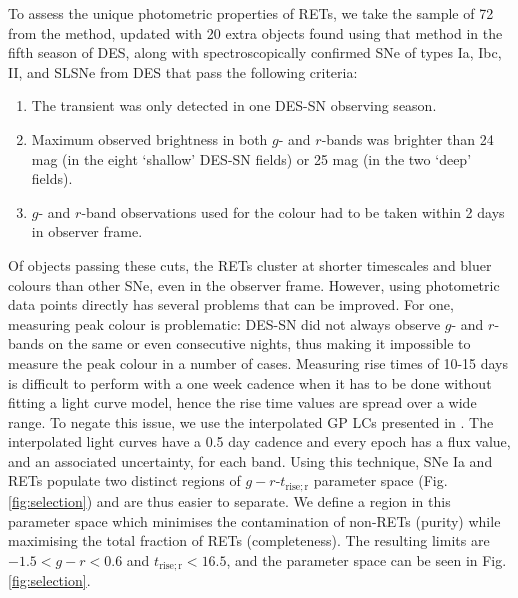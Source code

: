 \documentclass[fleqn,usenatbib,]{mnras}
\begin{document}
To assess the unique photometric properties of RETs, we take the sample of 72 from the  method, updated with 20 extra objects found using that method in the fifth season of DES, along with spectroscopically confirmed SNe of types Ia, Ibc, II, and SLSNe from DES that pass the following criteria:
\begin{enumerate}
\item The transient was only detected in one DES-SN observing season.
\item Maximum observed brightness in both $g$- and $r$-bands was brighter than 24 mag (in the eight `shallow' DES-SN fields) or 25 mag (in the two `deep' fields).
\item $g$- and $r$-band observations used for the colour had to be taken within 2 days in observer frame.
\end{enumerate}

Of objects passing these cuts, the RETs cluster at shorter timescales and bluer colours than other SNe, even in the observer frame. However, using photometric data points directly has several problems that can be improved. For one, measuring peak colour is problematic: DES-SN did not always observe $g$- and $r$-bands on the same or even consecutive nights, thus making it impossible to measure the peak colour in a number of cases. Measuring rise times of 10-15 days is difficult to perform with a one week cadence when it has to be done without fitting a light curve model, hence the rise time values are spread over a wide range. To negate this issue, we use the interpolated GP LCs presented in \citet{Pursiainen2019}. The interpolated light curves have a 0.5 day cadence and every epoch has a flux value, and an associated uncertainty, for each band. Using this technique, SNe Ia and RETs populate two distinct regions of $g-r$-$t_{\mathrm{rise; r}}$ parameter space (Fig. \ref{fig:selection}) and are thus easier to separate. We define a region in this parameter space which minimises the contamination of non-RETs (purity) while maximising the total fraction of RETs (completeness). The resulting limits are $-1.5 < g-r < 0.6 $ and $t_{\mathrm{rise; r}} <16.5$, and the parameter space can be seen in Fig. \ref{fig:selection}.
\end{document}
